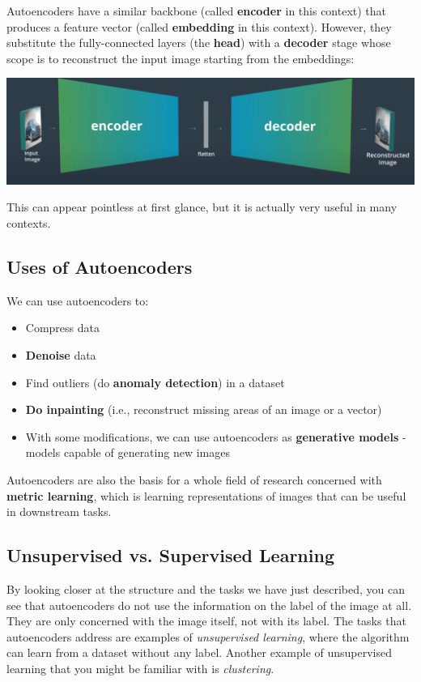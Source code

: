 Autoencoders have a similar backbone (called \textbf{encoder} in this context) that produces a feature vector (called \textbf{embedding} in this context). However, they substitute the fully-connected layers (the \textbf{head}) with a \textbf{decoder} stage whose scope is to reconstruct the input image starting from the embeddings:

\includegraphics[width=1\linewidth]{img//cnn//autoencoders/encoder-decoder.jpeg}

This can appear pointless at first glance, but it is actually very useful in many contexts.

\subsection{Uses of Autoencoders}

We can use autoencoders to:

\begin{itemize}
    \item Compress data
    \item \textbf{Denoise} data
    \item Find outliers (do \textbf{anomaly detection}) in a dataset
    \item \textbf{Do inpainting} (i.e., reconstruct missing areas of an image or a vector)
    \item With some modifications, we can use autoencoders as \textbf{generative models} - models capable of generating new images
\end{itemize}
Autoencoders are also the basis for a whole field of research concerned with \textbf{metric learning}, which is learning representations of images that can be useful in downstream tasks.

\subsection{Unsupervised vs. Supervised Learning}

By looking closer at the structure and the tasks we have just described, you can see that autoencoders do not use the information on the label of the image at all. They are only concerned with the image itself, not with its label. The tasks that autoencoders address are examples of \textit{unsupervised learning}, where the algorithm can learn from a dataset without any label. Another example of unsupervised learning that you might be familiar with is \textit{clustering}. \newline

